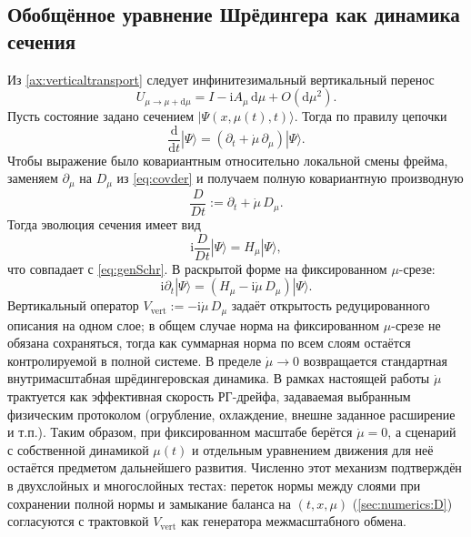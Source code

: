 \documentclass[11pt,a4paper]{article}
\newcommand{\ii}{\mathrm{i}}
\newcommand{\dd}{\mathrm{d}}
\theoremstyle{definition}
\theoremstyle{plain}
\theoremstyle{remark}
\begin{document}
\subsection{Обобщённое уравнение Шрёдингера как динамика сечения}
\label{sec:derivations:sch}

Из \cref{ax:verticaltransport} следует инфинитезимальный вертикальный перенос
\begin{equation}\label{eq:deriv_Umu}
U_{\mu\to\mu+\dd\mu}=I-\ii A_\mu\,\dd\mu+O(\dd\mu^2).
\end{equation}
Пусть состояние задано сечением $|\Psi(x,\mu(t),t)\rangle$. Тогда по правилу цепочки
\begin{equation}\label{eq:deriv_chain}
\frac{\dd}{\dd t}|\Psi\rangle = \left(\partial_t + \dot\mu\,\partial_\mu\right)|\Psi\rangle.
\end{equation}
Чтобы выражение было ковариантным относительно локальной смены фрейма, заменяем $\partial_\mu$ на $D_\mu$
из \cref{eq:covder} и получаем полную ковариантную производную
\begin{equation}\label{eq:deriv_Dt}
\frac{D}{Dt}:=\partial_t+\dot\mu\,D_\mu.
\end{equation}
Тогда эволюция сечения имеет вид
\begin{equation}\label{eq:deriv_genSch}
\ii\frac{D}{Dt}|\Psi\rangle=H_\mu|\Psi\rangle,
\end{equation}
что совпадает с \cref{eq:genSchr}. В раскрытой форме на фиксированном $\mu$-срезе:
\begin{equation}\label{eq:deriv_genSch_open}
\ii\partial_t|\Psi\rangle = \left(H_\mu-\ii\dot\mu\,D_\mu\right)|\Psi\rangle.
\end{equation}
Вертикальный оператор $V_{\mathrm{vert}}:=-\ii\dot\mu\,D_\mu$ задаёт открытость редуцированного описания на одном слое;
в общем случае норма на фиксированном $\mu$-срезе не обязана сохраняться, тогда как суммарная норма по всем слоям
остаётся контролируемой в полной системе. В пределе $\dot\mu\to 0$ возвращается стандартная внутримасштабная
шрёдингеровская динамика.
В рамках настоящей работы $\dot\mu$ трактуется как эффективная скорость РГ-дрейфа,
задаваемая выбранным физическим протоколом (огрубление, охлаждение, внешне заданное расширение и т.п.).
Таким образом, при фиксированном масштабе берётся $\dot\mu=0$, а сценарий с собственной динамикой $\mu(t)$
и отдельным уравнением движения для неё остаётся предметом дальнейшего развития.
Численно этот механизм подтверждён в двухслойных и многослойных тестах:
переток нормы между слоями при сохранении полной нормы и замыкание баланса на $(t,x,\mu)$
(\cref{sec:numerics:D}) согласуются с трактовкой $V_{\mathrm{vert}}$ как генератора межмасштабного обмена.
\end{document}
